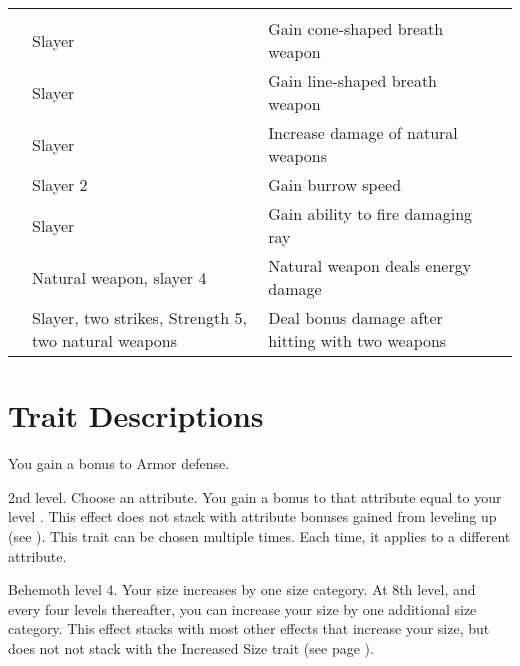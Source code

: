 \begin{longtabuwrapper}
\begin{longtabu}{>{\lcol}p{10em} >{\lcol}p{15em} >{\lcol}X >{\lcol}p{3em}}
            \midrule
            \label{Slayer Traits} &  &  &  \\
             & Slayer & Gain cone-shaped breath weapon &  \\
             & Slayer & Gain line-shaped breath weapon &  \\
             & Slayer & Increase damage of natural weapons &  \\
             & Slayer 2 & Gain burrow speed &  \\
             & Slayer & Gain ability to fire damaging ray &  \\
             & Natural weapon, slayer 4 & Natural weapon deals energy damage &  \\
             & Slayer, two strikes, Strength 5, two natural weapons & Deal bonus damage after hitting with two weapons &  \\
        \end{longtabu}
    \end{longtabuwrapper}

    \twocolumn

\section{Trait Descriptions}

    \featben You gain a  bonus to Armor defense.

    \featpre 2nd level.
    \featben Choose an attribute.
    You gain a bonus to that attribute equal to your level .
    This effect does not stack with attribute bonuses gained from leveling up (see ).
     This trait can be chosen multiple times.
    Each time, it applies to a different attribute.

    \featpre Behemoth level 4.
    \featben Your size increases by one size category.
    At 8th level, and every four levels thereafter, you can increase your size by one additional size category.
    This effect stacks with most other effects that increase your size, but does not not stack with the Increased Size trait (see page ).

